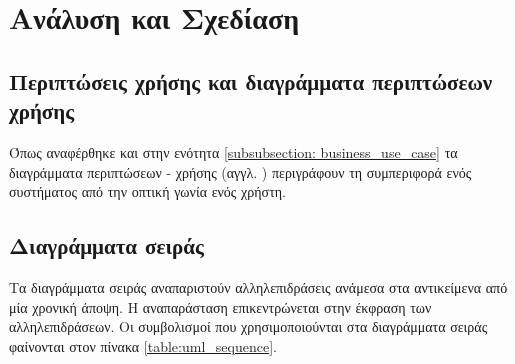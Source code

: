 \documentclass{assignment}
\begin{document}
\section{Ανάλυση και Σχεδίαση}

\subsection{Περιπτώσεις χρήσης και διαγράμματα περιπτώσεων χρήσης}

Όπως αναφέρθηκε και στην ενότητα \ref{subsubsection: business_use_case} τα διαγράμματα περιπτώσεων - χρήσης (αγγλ. ) περιγράφουν τη συμπεριφορά ενός συστήματος από την οπτική γωνία ενός χρήστη. 

\subsection{Διαγράμματα σειράς}

Τα διαγράμματα σειράς αναπαριστούν αλληλεπιδράσεις ανάμεσα στα αντικείμενα από μία χρονική άποψη. Η αναπαράσταση επικεντρώνεται στην έκφραση των αλληλεπιδράσεων. Οι συμβολισμοί που χρησιμοποιούνται στα διαγράμματα σειράς φαίνονται στον πίνακα \ref{table:uml_sequence}.
\end{document}
